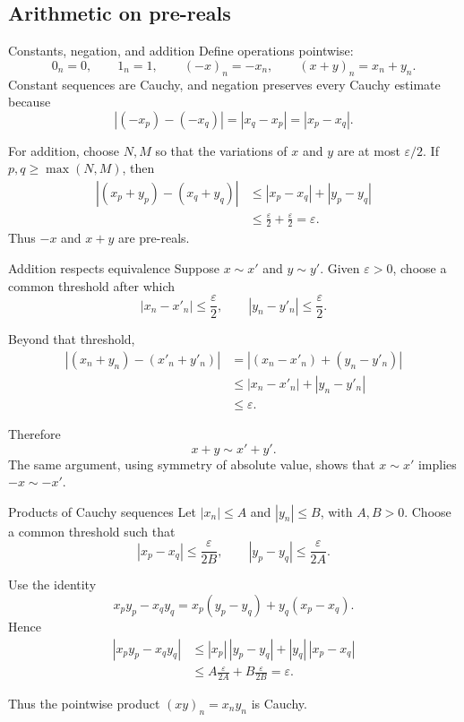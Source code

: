 \documentclass[aspectratio=169,11pt]{beamer}
\begin{document}
\subsection{Arithmetic on pre-reals}

\begin{frame}{Constants, negation, and addition}
  Define operations pointwise:
  \[
    0_n=0,
    \qquad
    1_n=1,
    \qquad
    (-x)_n=-x_n,
    \qquad
    (x+y)_n=x_n+y_n.
  \]
  Constant sequences are Cauchy, and negation preserves every Cauchy
  estimate because
  \[
    |(-x_p)-(-x_q)|=|x_q-x_p|=|x_p-x_q|.
  \]

  For addition, choose \(N,M\) so that the variations of \(x\) and \(y\) are
  at most \(\varepsilon/2\).  If \(p,q\ge\max(N,M)\), then
  \begin{align*}
    |(x_p+y_p)-(x_q+y_q)|
      &\le |x_p-x_q|+|y_p-y_q|\\
      &\le\frac\varepsilon2+\frac\varepsilon2=\varepsilon.
  \end{align*}
  Thus \(-x\) and \(x+y\) are pre-reals.
\end{frame}

\begin{frame}{Addition respects equivalence}
  Suppose \(x\sim x'\) and \(y\sim y'\).  Given \(\varepsilon>0\), choose a
  common threshold after which
  \[
    |x_n-x'_n|\le\frac\varepsilon2,
    \qquad
    |y_n-y'_n|\le\frac\varepsilon2.
  \]

  Beyond that threshold,
  \begin{align*}
    |(x_n+y_n)-(x'_n+y'_n)|
      &=|(x_n-x'_n)+(y_n-y'_n)|\\
      &\le |x_n-x'_n|+|y_n-y'_n|\\
      &\le\varepsilon.
  \end{align*}

  Therefore
  \[
    x+y\sim x'+y'.
  \]
  The same argument, using symmetry of absolute value, shows that
  \(x\sim x'\) implies \(-x\sim-x'\).
\end{frame}

\begin{frame}{Products of Cauchy sequences}
  Let \(|x_n|\le A\) and \(|y_n|\le B\), with \(A,B>0\).  Choose a common
  threshold such that
  \[
    |x_p-x_q|\le\frac\varepsilon{2B},
    \qquad
    |y_p-y_q|\le\frac\varepsilon{2A}.
  \]

  Use the identity
  \[
    x_py_p-x_qy_q
      =x_p(y_p-y_q)+y_q(x_p-x_q).
  \]
  Hence
  \begin{align*}
    |x_py_p-x_qy_q|
      &\le |x_p|\,|y_p-y_q|+|y_q|\,|x_p-x_q|\\
      &\le A\frac\varepsilon{2A}+B\frac\varepsilon{2B}
       =\varepsilon.
  \end{align*}

  Thus the pointwise product \((xy)_n=x_ny_n\) is Cauchy.
\end{frame}
\end{document}
